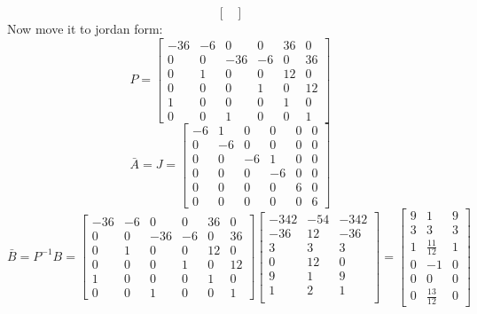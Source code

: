 \begin{enumerate}
\begin{enumerate}
\begin{equation}
\begin{bmatrix}
        \end{bmatrix}
      \end{equation}
      Now move it to jordan form:
      \begin{equation}
        P =
        \left[\begin{matrix}-36 & -6 & 0 & 0 & 36 & 0\\0 & 0 & -36 & -6 & 0 & 36\\0 & 1 & 0 & 0 & 12 & 0\\0 & 0 & 0 & 1 & 0 & 12\\1 & 0 & 0 & 0 & 1 & 0\\0 & 0 & 1 & 0 & 0 & 1\end{matrix}\right]
      \end{equation}
      \begin{equation}
        \bar A = J =
        \left[\begin{matrix}-6 & 1 & 0 & 0 & 0 & 0\\0 & -6 & 0 & 0 & 0 & 0\\0 & 0 & -6 & 1 & 0 & 0\\0 & 0 & 0 & -6 & 0 & 0\\0 & 0 & 0 & 0 & 6 & 0\\0 & 0 & 0 & 0 & 0 & 6\end{matrix}\right]
      \end{equation}
      \begin{equation}
        \bar B = P^{-1}B = 
        \left[\begin{matrix}-36 & -6 & 0 & 0 & 36 & 0\\0 & 0 & -36 & -6 & 0 & 36\\0 & 1 & 0 & 0 & 12 & 0\\0 & 0 & 0 & 1 & 0 & 12\\1 & 0 & 0 & 0 & 1 & 0\\0 & 0 & 1 & 0 & 0 & 1\end{matrix}\right]
        \begin{bmatrix}
          -342 & -54 & -342 \\
          -36 & 12 & -36 \\
          3 & 3 & 3 \\
          0 & 12 & 0 \\
          9 & 1 & 9 \\
          1 & 2 & 1 \\
        \end{bmatrix} =
        \left[\begin{matrix}9 & 1 & 9\\3 & 3 & 3\\1 & \frac{11}{12} & 1\\0 & -1 & 0\\0 & 0 & 0\\0 & \frac{13}{12} & 0\end{matrix}\right]

\end{equation}
\end{enumerate}
\end{enumerate}
